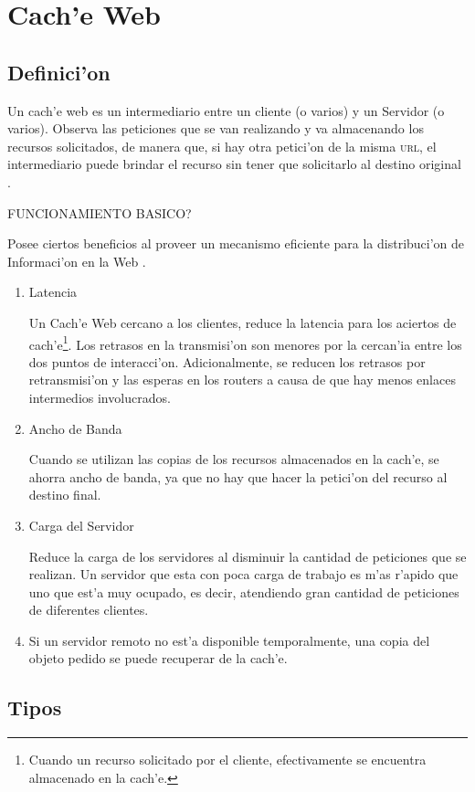 \chapter{Cach'e Web}
\label{cache}
\section{Definici'on}

Un cach'e web es un intermediario entre un cliente (o varios) y un Servidor (o varios). Observa las peticiones que se van realizando y va almacenando los recursos solicitados, de manera que, si hay otra petici'on de la misma \textsc{url}, el intermediario puede brindar el recurso sin tener que solicitarlo al destino original \citep{cacheDef}.

FUNCIONAMIENTO BASICO?

Posee ciertos beneficios al proveer un mecanismo eficiente para la distribuci'on de Informaci'on en la Web \citep[p. 20]{webCaching}.
\begin{enumerate}
\item Latencia

Un Cach'e Web cercano a los clientes, reduce la latencia para los aciertos de cach'e\footnote{Cuando un recurso solicitado por el cliente, efectivamente se encuentra almacenado en la cach'e.}. Los retrasos en la transmisi'on son menores por la cercan'ia entre los dos puntos de interacci'on. Adicionalmente, se reducen los retrasos por retransmisi'on y las esperas en los routers a causa de que hay menos enlaces intermedios involucrados.
\item Ancho de Banda

Cuando se utilizan las copias de los recursos almacenados en la cach'e, se ahorra ancho de banda, ya que no hay que hacer la petici'on del recurso al destino final.
\item Carga del Servidor

Reduce la carga de los servidores al disminuir la cantidad de peticiones que se realizan. Un servidor que esta con poca carga de trabajo es m'as r'apido que uno que est'a muy ocupado, es decir, atendiendo gran cantidad de peticiones de diferentes clientes.

\item Si un servidor remoto no est'a disponible temporalmente, una copia del objeto pedido se puede recuperar de la cach'e.
\end{enumerate}

\section{Tipos}

